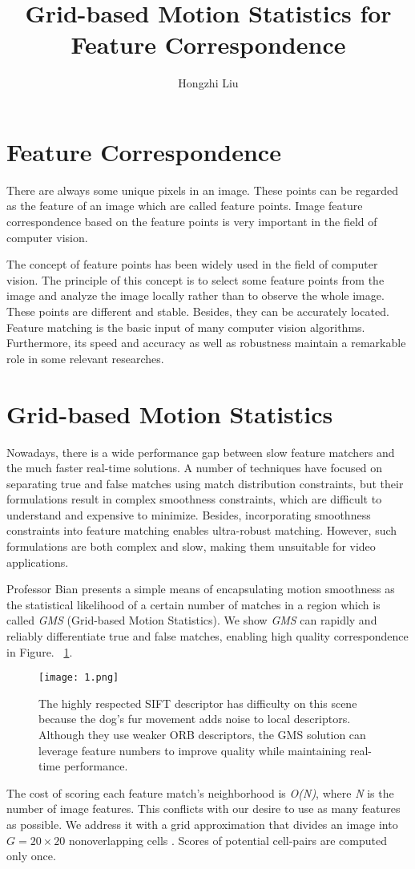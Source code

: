 \documentclass[twocolumn]{article}
\author{Hongzhi Liu}
\title{Grid-based Motion Statistics for Feature Correspondence}
\begin{document}
	\maketitle
	\par
	\section{Feature Correspondence}
	There are always some unique pixels in an image. These points can be regarded as the feature of an image which are called feature points. Image feature correspondence based on the feature points is very important in the field of computer vision.
	
	The concept of feature points has been widely used in the field of computer vision. The principle of this concept is to select some feature points from the image and analyze the image locally rather than to observe the whole image. These points are different and stable. Besides, they can be accurately located. Feature matching is the basic input of many computer vision algorithms. Furthermore, its speed and accuracy as well as robustness maintain a remarkable role in some relevant researches. 
	
    \section{Grid-based Motion Statistics}
	Nowadays, there is a wide performance gap between slow feature matchers and the much faster real-time solutions. A number of techniques have focused on separating true and false matches using match distribution constraints, but their formulations result in complex smoothness constraints, which are difficult to understand and expensive to minimize. Besides, incorporating smoothness constraints into feature matching enables ultra-robust matching. However, such formulations are both complex and slow, making them unsuitable for video applications.
	
	Professor Bian presents a simple means of encapsulating motion smoothness as the statistical likelihood of a certain number of matches in a region which is called \emph{GMS} (Grid-based Motion Statistics). We show \emph{GMS} can rapidly and reliably differentiate true and false matches, enabling high quality correspondence in Figure. ~\ref{GMS}.
	\begin{figure}[ht]
		\centering
		\texttt{[image: 1.png]}
		\caption{The highly respected SIFT \cite{Lowe2004Distinctive} descriptor has difficulty on this scene because the dog’s fur movement adds noise to local descriptors. Although they use weaker ORB descriptors, the GMS solution can leverage feature numbers to improve quality while maintaining real-time performance.}\label{GMS}
	\end{figure}
	The cost of scoring each feature match's neighborhood is \emph{O(N)}, where \emph{N} is the number of image features. This conflicts with our desire to use as many features as possible. We address it with a grid approximation that divides an image into $G = 20 \times 20 $ nonoverlapping cells \cite{Bian2017GMS}. Scores of potential cell-pairs are computed
	only once.  
	
\end{document}
